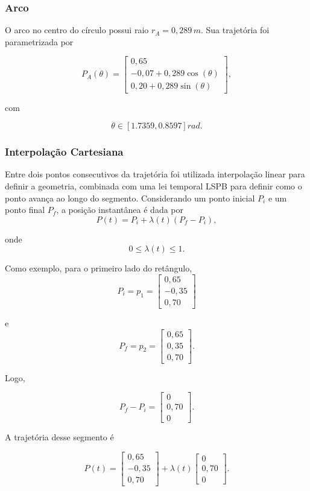 \subsubsection{Arco}

O arco no centro do círculo possui raio $r_A=0,289\,m$.
Sua trajetória foi parametrizada por

\[
P_A(\theta)=
\begin{bmatrix}
0,65\\
-0,07+0,289\cos(\theta)\\
0,20+0,289\sin(\theta)
\end{bmatrix},
\]

com

\[
\theta
\in
\left[
1.7359,
0.8597
\right]rad.
\]

\subsubsection{Interpolação Cartesiana}

Entre dois pontos consecutivos da trajetória foi utilizada interpolação linear para definir a geometria, combinada com uma lei temporal LSPB para definir como o ponto avança ao longo do segmento.
Considerando um ponto inicial \(P_i\) e um ponto final \(P_f\), a posição instantânea é dada por
\[
P(t)
=
P_i
+
\lambda(t)
\left(
P_f-P_i
\right),
\]

onde
\[
0 \le \lambda(t) \le 1.
\]

Como exemplo, para o primeiro lado do retângulo,
\[
P_i=p_1=
\begin{bmatrix}
0,65\\
-0,35\\
0,70
\end{bmatrix}
\]

e
\[
P_f=p_2=
\begin{bmatrix}
0,65\\
0,35\\
0,70
\end{bmatrix}.
\]

Logo,

\[
P_f-P_i=
\begin{bmatrix}
0\\
0,70\\
0
\end{bmatrix}.
\]

A trajetória desse segmento é

\[
P(t)
=
\begin{bmatrix}
0,65\\
-0,35\\
0,70
\end{bmatrix}
+
\lambda(t)
\begin{bmatrix}
0\\
0,70\\
0
\end{bmatrix}.
\]

